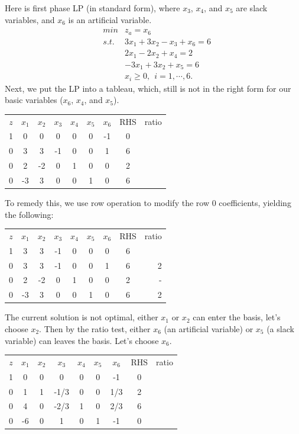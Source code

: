 Here is first phase LP (in standard form), where $x_3$, $x_4$, and $x_5$ are slack variables, and $x_6$ is an artificial variable.
\begin{eqnarray}
& min  & z_a = x_6 \nonumber \\
& s.t. & 3x_1 + 3x_2 - x_3 +x_6 = 6 \nonumber \\
&      & 2x_1 - 2x_2 + x_4 = 2 \nonumber \\
&      & -3x_1 + 3x_2 + x_5 = 6 \nonumber \\
&      & x_i \ge 0,~~ i =1,\cdots,6. \nonumber
\end{eqnarray}
Next, we put the LP into a tableau, which, still is not in the right form for our basic variables ($x_6$, $x_4$, and $x_5$).
\begin{center} \begin{tabular} {|c|c|c|c|c|c|c||c| r} \cline{1-8}
$z$	& $x_1$	& $x_2$	& $x_3$	& $x_4$	& $x_5$	& $x_6$	&  RHS & ratio \\ \cline{1-8}
1	&	  0 &	  0 &	 0 &	  0 &	  0 &	 -1 &    0 & \\
0	&	  3 &	  3 &	-1 &	  0 &	  0 &	  1 &	 6 & \\
0	&	  2 &	 -2 &	 0 &	  1 &	  0 &	  0 &	 2 & \\
0	&	  -3 &	  3 &	 0 &	  0 &	  1 &	  0 &	 6 & \\ \cline{1-8}
\end{tabular} \end{center}
To remedy this, we use row operation to modify the row 0 coefficients, yielding the following:
\begin{center} \begin{tabular} {|c|c|c|c|c|c|c||c| r} \cline{1-8}
$z$	& $x_1$	& $x_2$	& $x_3$	& $x_4$	& $x_5$	& $x_6$	&  RHS & ratio \\ \cline{1-8}
1	&	  3 &	  3 &	 -1 &	  0 &	  0 &	  0 &    6 &   \\
0	&	  3 &	  3 &	-1 &	  0 &	  0 &	  1 &	 6 &  2 \\
0	&	  2 &	 -2 &	 0 &	  1 &	  0 &	  0 &	 2 &  - \\
0	&	  -3 &	  3 &	 0 &	  0 &	  1 &	  0 &	 6 &  2 \\ \cline{1-8}
\end{tabular} \end{center}
The current solution is not optimal, either $x_1$ or $x_2$ can enter the basis, let's choose $x_2$. Then by the ratio test, either $x_6$ (an artificial variable) or $x_5$ (a slack variable) can leaves the basis.  Let's choose $x_6$.
\begin{center} \begin{tabular} {|c|c|c|c|c|c|c||c| r} \cline{1-8}
$z$	& $x_1$	& $x_2$	& $x_3$	& $x_4$	& $x_5$	& $x_6$	&  RHS & ratio \\ \cline{1-8}
1	&	  0 &	  0 &	 0 &	  0 &	  0 &  -1 &    0 & \\
0	&	  1 &	  1 &	-1/3 &	  0 &	  0 &   1/3 &	 2 & \\
0	&	  4 &	  0 &	-2/3 &	  1 &	  0 &   2/3 &	 6 & \\
0	&	 -6 &	  0 &	 1 &	  0 &	  1 &	 -1 &	 0 & \\ \cline{1-8}
\end{tabular} \end{center}
